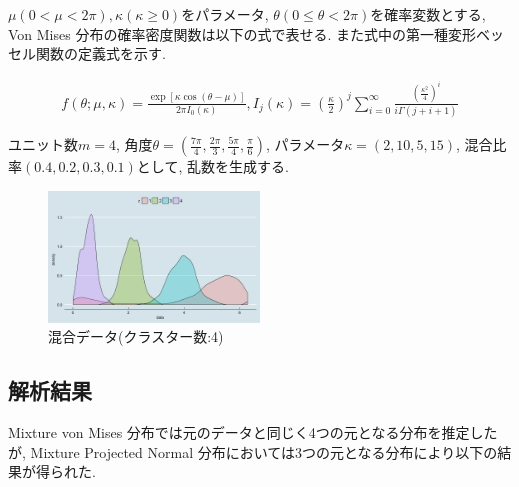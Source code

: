 \documentclass[a4j,12pt]{jarticle}
\begin{document}
$\mu(0 < \mu < 2\pi), \kappa(\kappa \geq 0) $をパラメータ, $\theta(0 \leq \theta < 2\pi)$を確率変数とする, Von Mises 分布の確率密度関数は以下の式で表せる. また式中の第一種変形ベッセル関数の定義式を示す.

\begin{eqnarray*}
f(\theta;\mu, \kappa) = \frac{\exp[\kappa \cos(\theta - \mu)]}{2 \pi I_0(\kappa)} , I_j(\kappa) = \left(\frac{\kappa}{2}\right)^j \sum^\infty_{i=0} \frac{\left(\frac{\kappa^2}{4}\right)^i}{i \Gamma(j + i + 1)}
\end{eqnarray*}

ユニット数$m=4$, 角度$\theta = \left( \frac{7\pi}{4}, \frac{2\pi}{3}, \frac{5\pi}{4}, \frac{\pi}{6}\right)$, パラメータ$\kappa= (2,10,5,15)$, 混合比率$(0.4, 0.2, 0.3, 0.1)$として, 乱数を生成する. 

\vspace{-1zh}
\begin{figure}[H]
\begin{center}
\includegraphics[clip,height= 35mm]{data/mix_test_data.png}
\end{center}
\caption{混合データ(クラスター数:4)}

\label{mixdata}
\end{figure}

\subsection{解析結果}

Mixture von Mises 分布では元のデータと同じく4つの元となる分布を推定したが, Mixture Projected Normal 分布においては3つの元となる分布により以下の結果が得られた.
\end{document}
